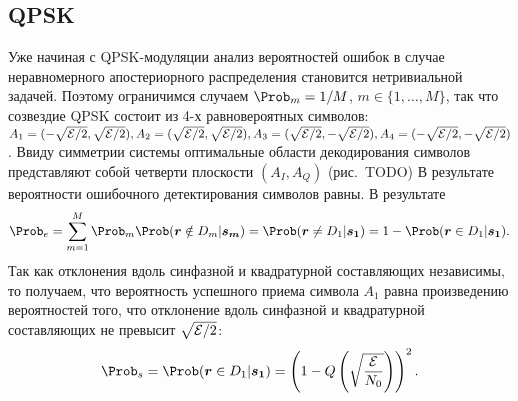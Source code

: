 \documentclass{book}
\numberwithin{theorem}{chapter}
\numberwithin{statement}{chapter}
\numberwithin{lemma}{chapter}
\theoremstyle{definition}
\numberwithin{task}{chapter}
\theoremstyle{remark}
\numberwithin{example}{chapter}
\theoremstyle{definition}
\numberwithin{definition}{chapter}
\theoremstyle{remark}
\theoremstyle{remark}
\numberwithin{lyrics}{section}
\begin{document}


%

\subsection{QPSK}
Уже начиная с QPSK-модуляции анализ вероятностей ошибок в случае неравномерного апостериорного распределения становится нетривиальной задачей. Поэтому ограничимся случаем $\Prob_m = 1/M$, $m \in \{1, \dots, M\}$, так что созвездие QPSK состоит из 4-х равновероятных символов: $A_1 = (-\sqrt{\mathcal{E}/2}, \sqrt{\mathcal{E}/2}), A_2 = (\sqrt{\mathcal{E}/2}, \sqrt{\mathcal{E}/2}), A_3 = (\sqrt{\mathcal{E}/2}, -\sqrt{\mathcal{E}/2}), A_4 = (-\sqrt{\mathcal{E}/2}, -\sqrt{\mathcal{E}/2})$. Ввиду симметрии системы оптимальные области декодирования символов представляют собой четверти плоскости $(A_I, A_Q)$ (рис.~TODO)
В результате вероятности ошибочного детектирования символов равны. В результате 
$$
\Prob_e = \Sum_{m = 1}^M \Prob_m \Prob(\vec{r} \notin D_m|\vec{s_m}) = \Prob(\vec{r} \neq D_1|\vec{s_1}) = 1 - \Prob(\vec{r} \in D_1|\vec{s_1}).
$$
Так как отклонения вдоль синфазной и квадратурной составляющих независимы, то получаем, что вероятность успешного приема символа $A_1$ равна произведению вероятностей того, что отклонение вдоль синфазной и квадратурной составляющих не превысит $\sqrt{\mathcal{E} / 2}$:
$$
\Prob_s = \Prob(\vec{r} \in D_1|\vec{s_1}) = \left(1 - Q\left(\sqrt{\frac{\Energy}{N_0}}\right)\right)^2.
$$
\end{document}
